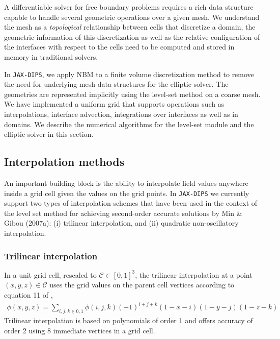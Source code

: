 \documentclass{elsarticle}
\begin{document}
A differentiable solver for free boundary problems requires a rich data structure capable to handle several geometric operations over a given mesh. We understand the mesh as a \textit{topological} relationship between cells that discretize a domain, the geometric information of this discretization as well as the relative configuration of the interfaces with respect to the cells need to be computed and stored in memory in traditional solvers. 

In \texttt{JAX-DIPS}, we apply NBM to a finite volume discretization method to remove the need for underlying mesh data structures for the elliptic solver. The geometries are represented implicitly using the level-set method on a coarse mesh. We have implemented a uniform grid that supports operations such as interpolations, interface advection, integrations over interfaces as well as in domains. We describe the numerical algorithms for the level-set module and the elliptic solver in this section.


\subsection{Interpolation methods}
An important building block is the ability to interpolate field values anywhere inside a grid cell given the values on the grid points. In \texttt{JAX-DIPS} we currently support two types of interpolation schemes that have been used in the context of the level set method for achieving second-order accurate solutions by Min \& Gibou (2007a)\cite{MIN2007300}: (i) trilinear interpolation, and (ii) quadratic non-oscillatory interpolation.


\subsubsection{Trilinear interpolation}
In a unit grid cell, rescaled to $\mathcal{C}\in [0,1]^3$, the trilinear interpolation at a point $(x,y,z)\in \mathcal{C}$ uses the grid values on the parent cell vertices according to equation 11 of \cite{MIN2007300},
\begin{align*}
 \phi(x,y,z)= \sum_{i,j,k\in {0,1}} \phi(i,j,k) (-1)^{i+j+k}(1-x-i)(1-y-j)(1-z-k)
\end{align*}
Trilinear interpolation is based on polynomials of order 1 and offers accuracy of order 2 using 8 immediate vertices in a grid cell.
\end{document}
